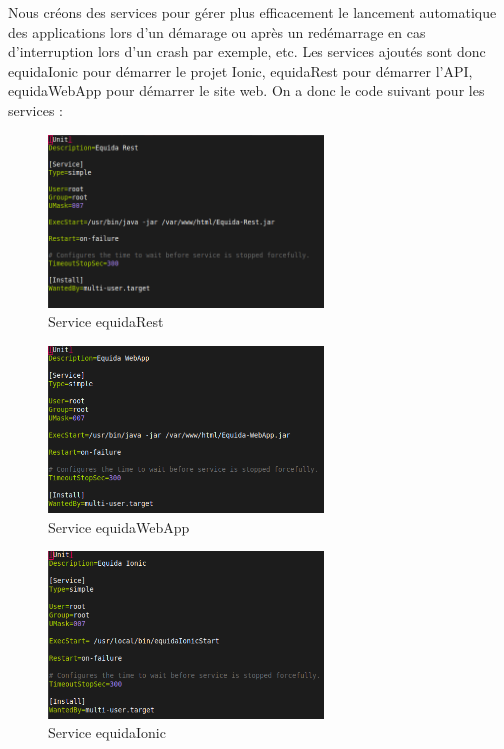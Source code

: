 \documentclass[report]{BetterDocument}
\begin{document}
		Nous créons des services pour gérer plus efficacement le lancement automatique des applications lors d'un démarage ou après un redémarrage en cas d'interruption lors d'un crash par exemple, etc. Les services ajoutés sont donc equidaIonic pour démarrer le projet Ionic, equidaRest pour démarrer l'API, equidaWebApp pour démarrer le site web. On a donc le code suivant pour les services :

		\begin{figure}[H]
			\centering\includegraphics[width=0.65\textwidth, keepaspectratio]{res/service-equidaRest.png}
			\caption{Service equidaRest}
		\end{figure}

		\begin{figure}[H]
			\centering\includegraphics[width=0.65\textwidth, keepaspectratio]{res/service-equidaWebApp.png}
			\caption{Service equidaWebApp}
		\end{figure}

		\begin{figure}[H]
			\centering\includegraphics[width=0.65\textwidth, keepaspectratio]{res/service-equidaIonic.png}
			\caption{Service equidaIonic}
		\end{figure}
\end{document}
